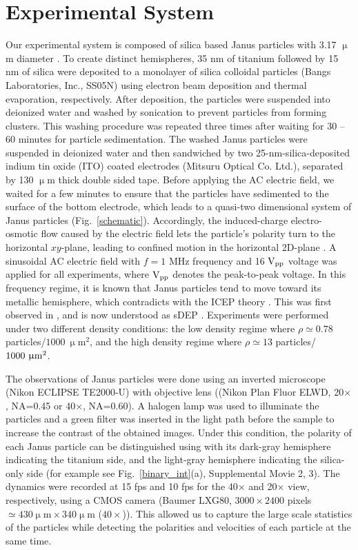 \documentclass[%
 reprint,
 amsmath,amssymb,
 aps,
 floatfix
]{revtex4-2}
\newcommand{\mum}{\upmu\textrm{m}}
\begin{document}
\section{Experimental System}
Our experimental system is composed of silica based Janus particles with 3.17 $\upmu$m diameter \cite{nishiguchi2018a}. 
To create distinct hemispheres, 35 nm of titanium followed by 15 nm of silica were deposited to a monolayer of silica colloidal particles (Bangs Laboratories, Inc., SS05N) using electron beam deposition and thermal evaporation, respectively. 
After deposition, the particles were suspended into deionized water and washed by sonication to prevent particles from forming clusters. 
This washing procedure was repeated three times after waiting for 30 -- 60 minutes for particle sedimentation. 
The washed Janus particles were suspended in deionized water and then sandwiched by two 25-nm-silica-deposited indium tin oxide (ITO) coated electrodes (Mitsuru Optical Co. Ltd.), separated by 130 $\upmu$m thick double sided tape. 
Before applying the AC electric field, we waited for a few minutes to ensure that the particles have sedimented to the surface of the bottom electrode, which leads to a quasi-two dimensional system of Janus particles (Fig.~\ref{schematic}). 
Accordingly, the induced-charge electro-osmotic flow caused by the electric field lets the particle's polarity turn to the horizontal $xy$-plane, leading to confined motion in the horizontal 2D-plane \cite{kilic2011}. 
A sinusoidal AC electric field with $f = 1$ MHz frequency and 16 ${\rm V_{pp}}$ voltage was applied for all experiments, where ${\rm  V_{pp}}$ denotes the peak-to-peak voltage.
In this frequency regime, it is known that Janus particles tend to move toward its metallic hemisphere, which contradicts with the ICEP theory \cite{squires2004, squires2006, gangwal2008}. This was first observed in \cite{suzuki2011}, and is now understood as sDEP \cite{boymelgreen2012, boymelgreen2016}.
Experiments were performed under two different density conditions: the low density regime where $\rho\simeq0.78$ particles/$1000\ \upmu$m$^2$, and the high density regime where $\rho\simeq13$ particles/$1000\ {\rm \upmu m}^2$.

The observations of Janus particles were done using an inverted microscope (Nikon ECLIPSE TE2000-U) with objective lens ((Nikon Plan Fluor ELWD, 20$\times$, NA=0.45 or 40$\times$, NA=0.60).
A halogen lamp was used to illuminate the particles and a green filter was inserted in the light path before the sample to increase the contrast of the obtained images.
Under this condition, the polarity of each Janus particle can be distinguished using with its dark-gray hemisphere indicating the titanium side, and the light-gray hemisphere indicating the silica-only side (for example see Fig.~\ref{binary_int}(a), Supplemental Movie 2, 3). 
The dynamics were recorded at 15 fps and 10 fps for the 40$\times$ and 20$\times$ view, respectively, using a CMOS camera (Baumer LXG80, $3000\times 2400$ pixels $\simeq 430 \mum \times 340 \mum$ ($40\times$)). This allowed us to capture the large scale statistics of the particles while detecting the polarities and velocities of each particle at the same time.
\end{document}
